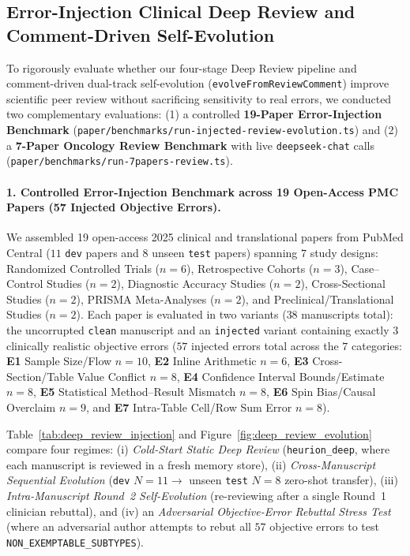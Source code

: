 \documentclass[11pt,a4paper]{article}
\begin{document}
\subsection{Error-Injection Clinical Deep Review and Comment-Driven Self-Evolution}
\label{sec:eval_deep_review}
To rigorously evaluate whether our four-stage Deep Review pipeline and comment-driven dual-track self-evolution (\texttt{evolveFromReviewComment}) improve scientific peer review without sacrificing sensitivity to real errors, we conducted two complementary evaluations: (1) a controlled \textbf{19-Paper Error-Injection Benchmark} (\texttt{paper/benchmarks/run-injected-review-evolution.ts}) and (2) a \textbf{7-Paper Oncology Review Benchmark} with live \texttt{deepseek-chat} calls (\texttt{paper/benchmarks/run-7papers-review.ts}).

\paragraph{1. Controlled Error-Injection Benchmark across 19 Open-Access PMC Papers (57 Injected Objective Errors).}
We assembled 19 open-access 2025 clinical and translational papers from PubMed Central ($11$ \texttt{dev} papers and $8$ unseen \texttt{test} papers) spanning $7$ study designs: Randomized Controlled Trials ($n=6$), Retrospective Cohorts ($n=3$), Case--Control Studies ($n=2$), Diagnostic Accuracy Studies ($n=2$), Cross-Sectional Studies ($n=2$), PRISMA Meta-Analyses ($n=2$), and Preclinical/Translational Studies ($n=2$). Each paper is evaluated in two variants ($38$ manuscripts total): the uncorrupted \texttt{clean} manuscript and an \texttt{injected} variant containing exactly $3$ clinically realistic objective errors ($57$ injected errors total across the $7$ categories: \textbf{E1} Sample Size/Flow $n=10$, \textbf{E2} Inline Arithmetic $n=6$, \textbf{E3} Cross-Section/Table Value Conflict $n=8$, \textbf{E4} Confidence Interval Bounds/Estimate $n=8$, \textbf{E5} Statistical Method--Result Mismatch $n=8$, \textbf{E6} Spin Bias/Causal Overclaim $n=9$, and \textbf{E7} Intra-Table Cell/Row Sum Error $n=8$).

Table~\ref{tab:deep_review_injection} and Figure~\ref{fig:deep_review_evolution} compare four regimes: (i) \emph{Cold-Start Static Deep Review} (\texttt{heurion\_deep}, where each manuscript is reviewed in a fresh memory store), (ii) \emph{Cross-Manuscript Sequential Evolution} (\texttt{dev} $N=11 \to$ unseen \texttt{test} $N=8$ zero-shot transfer), (iii) \emph{Intra-Manuscript Round~2 Self-Evolution} (re-reviewing after a single Round~1 clinician rebuttal), and (iv) an \emph{Adversarial Objective-Error Rebuttal Stress Test} (where an adversarial author attempts to rebut all $57$ objective errors to test \texttt{NON\_EXEMPTABLE\_SUBTYPES}).
\end{document}
